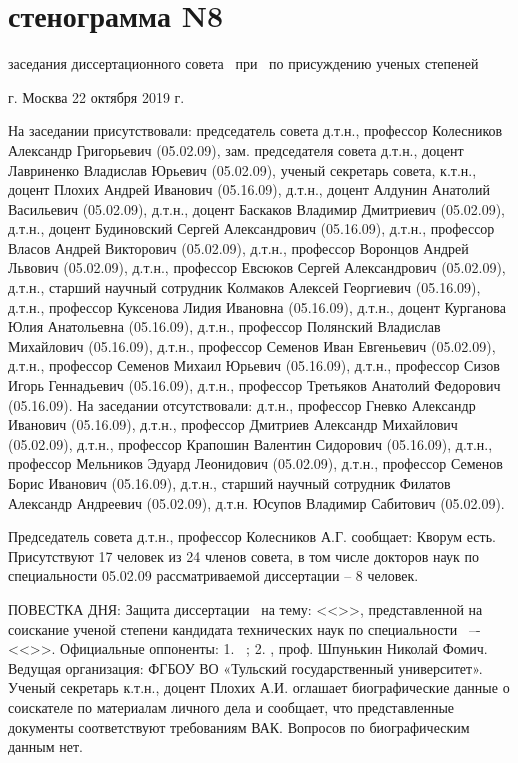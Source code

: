 \section{стенограмма N8}
заседания диссертационного совета \
при \thesisInOrganization\
по присуждению ученых степеней

г. Москва	22 октября 2019 г.

На заседании присутствовали: председатель совета д.т.н., профессор 
Колесников Александр Григорьевич (05.02.09), зам. председателя совета д.т.н., 
доцент Лавриненко Владислав Юрьевич (05.02.09), ученый секретарь совета, к.т.н., доцент Плохих Андрей Иванович (05.16.09), д.т.н., доцент Алдунин Анатолий 
Васильевич (05.02.09), д.т.н., доцент Баскаков Владимир Дмитриевич (05.02.09), д.т.н., доцент Будиновский Сергей Александрович (05.16.09), д.т.н., профессор 
Власов Андрей Викторович (05.02.09), д.т.н., профессор Воронцов Андрей Львович (05.02.09), д.т.н., профессор Евсюков Сергей Александрович (05.02.09), д.т.н., 
старший научный сотрудник Колмаков Алексей Георгиевич (05.16.09), д.т.н., 
профессор Куксенова Лидия Ивановна (05.16.09), д.т.н., доцент Курганова Юлия 
Анатольевна (05.16.09), д.т.н., профессор Полянский Владислав Михайлович (05.16.09), д.т.н., профессор Семенов Иван Евгеньевич (05.02.09), д.т.н., профессор 
Семенов Михаил Юрьевич (05.16.09), д.т.н., профессор Сизов Игорь Геннадьевич (05.16.09), д.т.н., профессор Третьяков Анатолий Федорович (05.16.09).
На заседании отсутствовали: д.т.н., профессор Гневко Александр Иванович (05.16.09), д.т.н., профессор Дмитриев Александр Михайлович (05.02.09), д.т.н., 
профессор Крапошин Валентин Сидорович (05.16.09), д.т.н., профессор Мельников Эдуард Леонидович (05.02.09), д.т.н., профессор Семенов Борис Иванович (05.16.09), д.т.н., старший научный сотрудник Филатов Александр Андреевич (05.02.09), д.т.н. Юсупов Владимир Сабитович (05.02.09).

Председатель совета д.т.н., профессор Колесников А.Г. сообщает: 
Кворум есть. Присутствуют 17 человек из 24 членов совета, в том числе докторов наук по специальности 05.02.09 рассматриваемой диссертации – 8 человек.

ПОВЕСТКА ДНЯ:
Защита диссертации \thesisAuthorLastNameFromFull\ на тему: <<\thesisTitle>>, представленной на соискание ученой степени кандидата технических наук по специальности \thesisSpecialtyNumber\ –- <<\thesisSpecialtyTitle>>.
Официальные оппоненты:
1. \opponentOneRegalia\ \opponentOneFio;
2. \opponentTwoRegalia, проф. Шпунькин Николай Фомич.
Ведущая организация: ФГБОУ ВО «Тульский государственный университет».
Ученый секретарь к.т.н., доцент Плохих А.И. оглашает биографические данные о соискателе по материалам личного дела и сообщает, что представленные документы соответствуют требованиям ВАК.
Вопросов по биографическим данным нет.

